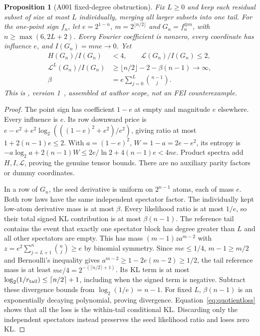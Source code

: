 \documentclass[11pt]{article}
\newtheorem{proposition}[lemma]{Proposition}
\begin{document}
\begin{proposition}[A001 fixed-degree obstruction]\label{prop:degree}
Fix $L\ge0$ and keep each residual subset of size at most $L$ individually,
merging all larger subsets into one tail. For the one-point sign $f_n$,
let $e=2^{1-n}$, $m=2^{\lfloor n/2\rfloor}$ and $G_n=f_n^{\otimes m}$,
with $n\ge\max(6,2L+2)$. Every Fourier coefficient is nonzero, every
coordinate has influence $e$, and $I(G_n)=mn e\to0$. Yet
\begin{align*}
 H(G_n)/I(G_n)&<4,\qquad\mathcal L(G_n)/I(G_n)\le2,\\
 \mathcal L^{L}(G_n)/I(G_n)
 &\ge\lfloor n/2\rfloor-2-\beta(n-1)\longrightarrow\infty,\\
 \beta&=e\sum_{j=0}^L\binom{n-1}{j}.
\end{align*}
This is , version 1~\cite{A001d},
assembled at author scope, not an FEI counterexample.
\end{proposition}
\begin{proof}
The point sign has coefficient $1-e$ at empty and magnitude $e$ elsewhere.
Every influence is $e$. Its row downward price is
$e-e^2+e^2\log_2(((1-e)^2+e^2)/e^2)$, giving ratio at most
$1+2(n-1)e\le2$. With $a=(1-e)^2$, $W=1-a=2e-e^2$, its entropy is
$-a\log_2 a+2(n-1)W\le2e/\ln2+4(n-1)e<4ne$.
Product spectra add $H,I,\mathcal L$, proving the genuine tensor bounds.
There are no auxiliary parity factors or dummy coordinates.

In a row of $G_n$, the seed derivative is uniform on $2^{n-1}$ atoms,
each of mass $e$. Both row laws have the same independent spectator
factor. The individually kept low-atom derivative mass is at most $\beta$.
Every likelihood ratio is at most $1/e$, so their total signed KL
contribution is at most $\beta(n-1)$.
The reference tail contains the event that exactly one spectator block
has degree greater than $L$ and all other spectators are empty.
This has mass $(m-1)z a^{m-2}$ with
$z=e^2\sum_{j=L+1}^n\binom nj\ge e$ by binomial symmetry.
Since $me\le1/4$, $m-1\ge m/2$ and Bernoulli's inequality gives
$a^{m-2}\ge1-2e(m-2)\ge1/2$, the tail reference mass is at least
$me/4=2^{-(\lceil n/2\rceil+1)}$.
Its KL term is at most $\log_2(1/r_{\rm tail})\le\lceil n/2\rceil+1$,
including when the signed term is negative. Subtract these divergence
bounds from $\log_2(1/e)=n-1$. For fixed $L$, $\beta(n-1)$ is an
exponentially decaying polynomial, proving divergence.
Equation~\eqref{eq:quotientloss} shows that all the loss is the
within-tail conditional KL. Discarding only the independent spectators
instead preserves the seed likelihood ratio and loses zero KL.
\end{proof}
\end{document}
